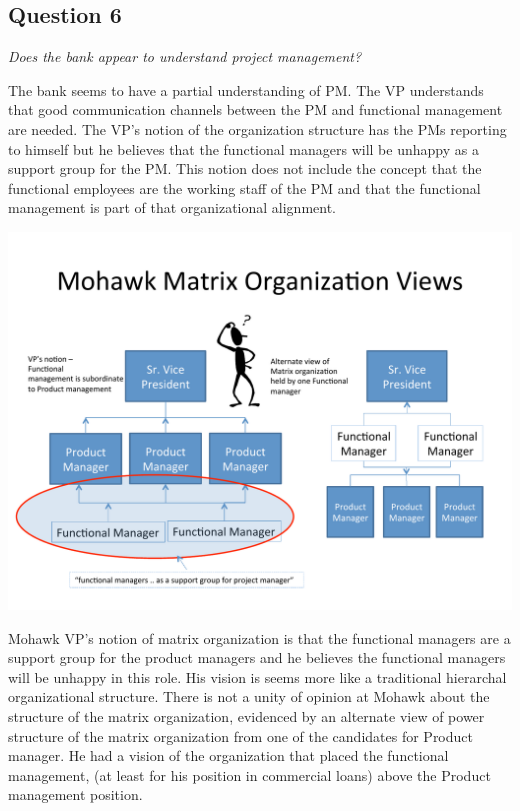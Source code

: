 \documentclass[letterpaper,10pt]{article}
\begin{document}
\subsection{Question 6}
\emph{Does the bank appear to understand project management?}\vspace*{1em}

The bank seems to have a partial understanding of PM.  The VP understands that good communication channels between the PM and functional management are needed.  The VP's notion of the organization structure has the PMs reporting to himself but he believes that the functional managers will be unhappy as a support group for the PM.  This notion does not include the concept that the functional employees are the working staff of the PM and that the functional management is part of that organizational alignment.  

\begin{center}
\includegraphics[scale=0.35]{figure1.pdf}
\end{center}

Mohawk VP's notion of matrix organization is that the functional managers are a support group for the product managers and he believes the functional managers will be unhappy in this role.  His vision is seems more like a traditional hierarchal organizational structure.  There is not a unity of opinion at Mohawk about the structure of the matrix organization, evidenced by an alternate view of power structure of the matrix organization from one of the candidates for Product manager. He had a vision of the organization that placed the functional management, (at least for his position in commercial loans) above the Product management position. 
\end{document}
